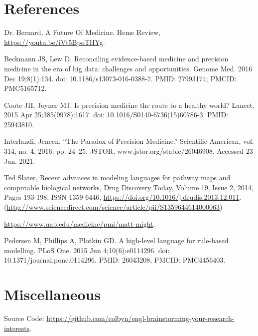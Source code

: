 \section*{References}

\newcommand{\source}[2]{
\item [({#1})]{#2}
}

\begin{description}[align=right]
\source{Bernard}{Dr. Bernard, A Future Of Medicine. Heme Review, \url{https://youtu.be/iVt5BpoTHYg}.}
\source{Beckmann}{Beckmann JS, Lew D. Reconciling evidence-based medicine and precision medicine in the era of big data: challenges and opportunities. Genome Med. 2016 Dec 19;8(1):134. doi: 10.1186/s13073-016-0388-7. PMID: 27993174; PMCID: PMC5165712.}
\source{Coote}{Coote JH, Joyner MJ. Is precision medicine the route to a healthy world? Lancet. 2015 Apr 25;385(9978):1617. doi: 10.1016/S0140-6736(15)60786-3. PMID: 25943810.}
\source{Interlandi}{Interlandi, Jeneen. “The Paradox of Precision Medicine.” Scientific American, vol. 314, no. 4, 2016, pp. 24–25. JSTOR, www.jstor.org/stable/26046908. Accessed 23 Jan. 2021.}
\source{Slater}{Ted Slater, Recent advances in modeling languages for pathway maps and computable biological networks, Drug Discovery Today, Volume 19, Issue 2, 2014, Pages 193-198, ISSN 1359-6446, \url{https://doi.org/10.1016/j.drudis.2013.12.011}. (\url{http://www.sciencedirect.com/science/article/pii/S1359644614000063})}
\source{Might}{\url{https://www.uab.edu/medicine/pmi/matt-might}.}
\source{Kappa}{Pedersen M, Phillips A, Plotkin GD. A high-level language for rule-based modelling. PLoS One. 2015 Jun 4;10(6):e0114296. doi: 10.1371/journal.pone.0114296. PMID: 26043208; PMCID: PMC4456403.}
\end{description}

\section*{Miscellaneous}
\begin{center}
    Source Code: \url{https://github.com/colbyn/engl-brainstorming-your-research-interests}.
\end{center}

